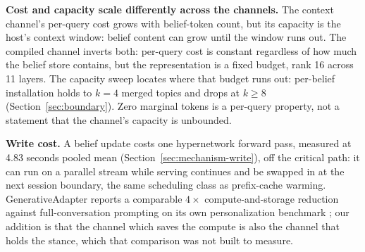 \textbf{Cost and capacity scale differently across the channels.} The context
channel's per-query cost grows with belief-token count, but its capacity is the host's
context window: belief content can grow until the window runs out. The compiled
channel inverts both: per-query cost is constant regardless of how much the belief
store contains, but the representation is a fixed budget, rank 16 across 11 layers.
The capacity sweep locates where that budget runs out: per-belief installation holds to
\(k=4\) merged topics and drops at \(k \ge 8\) (Section~\ref{sec:boundary}). Zero
marginal tokens is a per-query property, not a statement that the channel's capacity is
unbounded.

\textbf{Write cost.} A belief update costs one hypernetwork forward pass, measured at
4.83 seconds pooled mean (Section~\ref{sec:mechanism-write}), off the critical path: it
can run on a parallel stream while serving continues and be swapped in at the next
session boundary, the same scheduling class as prefix-cache warming. GenerativeAdapter
reports a comparable $4\times$ compute-and-storage reduction against full-conversation
prompting on its own personalization benchmark \citep{chen2025generativeadapter}; our
addition is that the channel which saves the compute is also the channel that holds the
stance, which that comparison was not built to measure.
